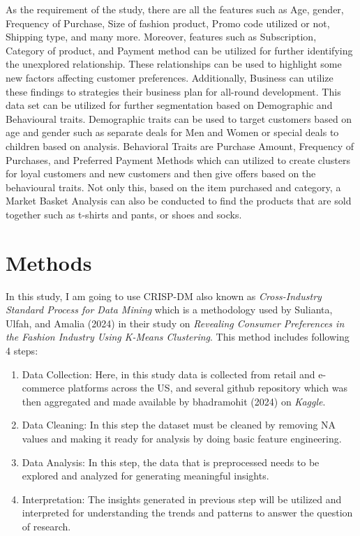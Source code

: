 \documentclass[
  letterpaper,
  DIV=11,
  numbers=noendperiod]{scrartcl}
\begin{document}
As the requirement of the study, there are all the features such as Age,
gender, Frequency of Purchase, Size of fashion product, Promo code
utilized or not, Shipping type, and many more. Moreover, features such
as Subscription, Category of product, and Payment method can be utilized
for further identifying the unexplored relationship. These relationships
can be used to highlight some new factors affecting customer
preferences. Additionally, Business can utilize these findings to
strategies their business plan for all-round development. This data set
can be utilized for further segmentation based on Demographic and
Behavioural traits. Demographic traits can be used to target customers
based on age and gender such as separate deals for Men and Women or
special deals to children based on analysis. Behavioral Traits are
Purchase Amount, Frequency of Purchases, and Preferred Payment Methods
which can utilized to create clusters for loyal customers and new
customers and then give offers based on the behavioural traits. Not only
this, based on the item purchased and category, a Market Basket Analysis
can also be conducted to find the products that are sold together such
as t-shirts and pants, or shoes and socks.

\section{Methods}\label{methods}

In this study, I am going to use CRISP-DM also known as
\emph{Cross-Industry Standard Process for Data Mining} which is a
methodology used by Sulianta, Ulfah, and Amalia (2024) in their study on
\emph{Revealing Consumer Preferences in the Fashion Industry Using
K-Means Clustering}. This method includes following 4 steps:

\begin{enumerate}
\def\labelenumi{\arabic{enumi}.}
\item
  Data Collection: Here, in this study data is collected from retail and
  e-commerce platforms across the US, and several github repository
  which was then aggregated and made available by bhadramohit (2024) on
  \emph{Kaggle}.
\item
  Data Cleaning: In this step the dataset must be cleaned by removing NA
  values and making it ready for analysis by doing basic feature
  engineering.
\item
  Data Analysis: In this step, the data that is preprocessed needs to be
  explored and analyzed for generating meaningful insights.
\item
  Interpretation: The insights generated in previous step will be
  utilized and interpreted for understanding the trends and patterns to
  answer the question of research.
\end{enumerate}
\end{document}
